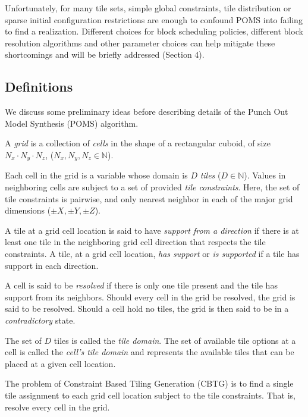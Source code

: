 Unfortunately, for many tile sets, simple global constraints, tile distribution or sparse initial configuration restrictions
are enough to
confound POMS into failing to find a realization.
Different choices for block scheduling policies, 
different block resolution algorithms
and other parameter choices
can help mitigate these shortcomings and will be briefly addressed (Section 4).


\subsection{Definitions}

We discuss some preliminary ideas before describing details
of the Punch Out Model Synthesis (POMS) algorithm.

A \textit{grid} is a collection of \textit{cells} in the shape of a rectangular cuboid,
of size $N_x \cdot N_y \cdot N_z$, ($N_x, N_y, N_z \in \mathbb{N}$).

Each cell in the grid is a variable whose domain is $D$ \textit{tiles} ($D \in \mathbb{N}$).
Values in neighboring cells are subject to a set of provided \textit{tile constraints}.
%
%
Here, the set of tile constraints is pairwise, and only nearest neighbor in each of the major grid dimensions ($\pm X, \pm Y, \pm Z$).

A tile at a grid cell location is said to have \textit{support from a direction} if there is at least
one tile in the neighboring grid cell direction that respects the tile constraints.
A tile, at a grid cell location, \textit{has support} or \textit{is supported} if a tile has support in each direction.

A cell is said to be \textit{resolved} if there is only one tile present and the tile has support from its neighbors.
Should every cell in the grid be resolved, the grid is said to be resolved.
Should a cell hold no tiles, the grid is then said to be in a \textit{contradictory} state.

The set of $D$ tiles is called the \textit{tile domain}.
The set of available tile options at a cell is called the \textit{cell's tile domain} and represents the
available tiles that can be placed at a given cell location.


The problem of Constraint Based Tiling Generation (CBTG) is to
find a single tile assignment to each grid cell location subject to the tile constraints.
That is, resolve every cell in the grid.

